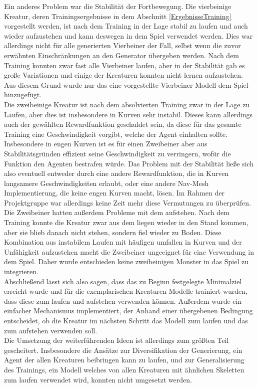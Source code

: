 Ein anderes Problem war die Stabilität der Fortbewegung. Die vierbeinige Kreatur, deren Trainingsergebnisse in dem Abschnitt \ref{ErgebnisseTraining} vorgestellt werden, ist nach dem Training in der Lage stabil zu laufen und auch wieder aufzustehen und kann deswegen in dem Spiel verwendet werden. 
Dies war allerdings nicht für alle generierten Vierbeiner der Fall, selbst wenn die zuvor erwähnten Einschränkungen an den Generator übergeben werden. Nach dem Training konnten zwar fast alle Vierbeiner laufen, aber in der Stabilität gab es große Variationen und einige der Kreaturen konnten nicht lernen aufzustehen. Aus diesem Grund wurde nur das eine vorgestellte Vierbeiner Modell dem Spiel hinzugefügt.\\
Die zweibeinige Kreatur ist nach dem absolvierten Training zwar in der Lage zu Laufen, aber dies ist insbesondere in Kurven sehr instabil. Dieses kann allerdings auch der gewählten Rewardfunktion geschuldet sein, da diese für das gesamte Training eine Geschwindigkeit vorgibt, welche der Agent einhalten sollte. Insbesondere in engen Kurven ist es für einen Zweibeiner aber aus Stabilitätsgründen effizient seine Geschwindigkeit zu verringern, wofür die Funktion den Agenten bestrafen würde. Das Problem mit der Stabilität ließe sich also eventuell entweder durch eine andere Rewardfunktion, die in Kurven langsamere Geschwindigkeiten erlaubt, oder eine andere Nav-Mesh Implementierung, die keine engen Kurven macht, lösen. Im Rahmen der Projektgruppe war allerdings keine Zeit mehr diese Vermutungen zu überprüfen.\\
Die Zweibeiner hatten außerdem Probleme mit dem aufstehen. Nach dem Training konnte die Kreatur zwar aus dem liegen wieder in den Stand kommen, aber sie blieb danach nicht stehen, sondern fiel wieder zu Boden. Diese Kombination aus instabilem Laufen mit häufigen umfallen in Kurven und der Unfähigkeit aufzustehen macht die Zweibeiner ungeeignet für eine Verwendung in dem Spiel. Daher wurde entschieden keine zweibeinigen Monster in das Spiel zu integrieren. \\

Abschließend lässt sich also sagen, dass das zu Beginn festgelegte Minimalziel erreicht wurde und für die exemplarischen Kreaturen Modelle trainiert wurden, dass diese zum laufen und aufstehen verwenden können. Außerdem wurde ein einfacher Mechanismus implementiert, der Anhand einer übergebenen Bedingung entscheidet, ob die Kreatur im nächsten Schritt das Modell zum laufen und das zum aufstehen verwenden soll. \\
Die Umsetzung der weiterführenden Ideen ist allerdings zum größten Teil gescheitert. 
Insbesondere die Ansätze zur Diversifikation der Generierung, ein Agent der allen Kreaturen beibringen kann zu laufen, und zur Generalisierung des Trainings, ein Modell welches von allen Kreaturen mit ähnlichen Skeletten zum laufen verwendet wird, konnten nicht umgesetzt werden.

